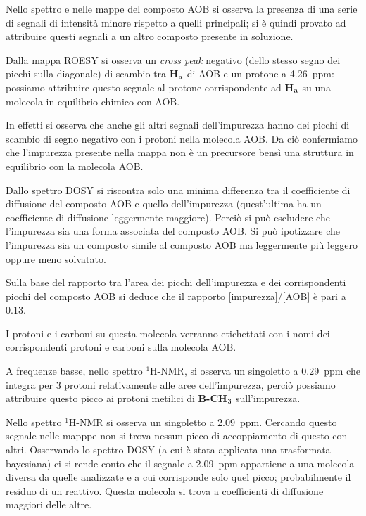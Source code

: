 \documentclass[a4paper, italian, oneside, 12pt]{article}
\begin{document}
Nello spettro e nelle mappe del composto AOB si osserva la presenza di una serie di segnali di intensità minore rispetto a quelli principali; si è quindi provato ad attribuire questi segnali a un altro composto presente in soluzione.

Dalla mappa ROESY si osserva un {\emph{cross peak}} negativo (dello stesso segno dei picchi sulla diagonale) di scambio tra {\bf{H$_{\textrm a}$}} di AOB e un protone a 4.26~ppm: possiamo attribuire questo segnale al protone corrispondente ad {\bf{H$_{\textrm a}$}} su una molecola in equilibrio chimico con AOB. 

In effetti si osserva che anche gli altri segnali dell'impurezza hanno dei picchi di scambio di segno negativo con i protoni nella molecola AOB. Da ciò confermiamo che l'impurezza presente nella mappa non è un precursore bensì una struttura in equilibrio con la molecola AOB.

Dallo spettro DOSY si riscontra solo una minima differenza tra il coefficiente di diffusione del composto AOB e quello dell'impurezza (quest'ultima ha un coefficiente di diffusione leggermente maggiore). Perciò si può escludere che l'impurezza sia una forma associata del composto AOB. Si può ipotizzare che l'impurezza sia un composto simile al composto AOB ma leggermente più leggero oppure meno solvatato.

Sulla base del rapporto tra l'area dei picchi dell'impurezza e dei corrispondenti picchi del composto AOB si deduce che il rapporto [impurezza]/[AOB] è pari a 0.13.

I protoni e i carboni su questa molecola verranno etichettati con i nomi dei corrispondenti protoni e carboni sulla molecola AOB.

A frequenze basse, nello spettro $^1$H-NMR, si osserva un singoletto a 0.29~ppm che integra per 3 protoni relativamente alle aree dell'impurezza, perciò possiamo attribuire questo picco ai protoni metilici di {\bf{B-CH$_{\textrm 3}$}} sull'impurezza.

Nello spettro $^1$H-NMR si osserva un singoletto a 2.09~ppm. Cercando questo segnale nelle mapppe non si trova nessun picco di accoppiamento di questo con altri. Osservando lo spettro DOSY (a cui è stata applicata una trasformata bayesiana) ci si rende conto che il segnale a 2.09~ppm appartiene a una molecola diversa da quelle analizzate e a cui corrisponde solo quel picco; probabilmente il residuo di un reattivo. Questa molecola si trova a coefficienti di diffusione maggiori delle altre.
\end{document}
